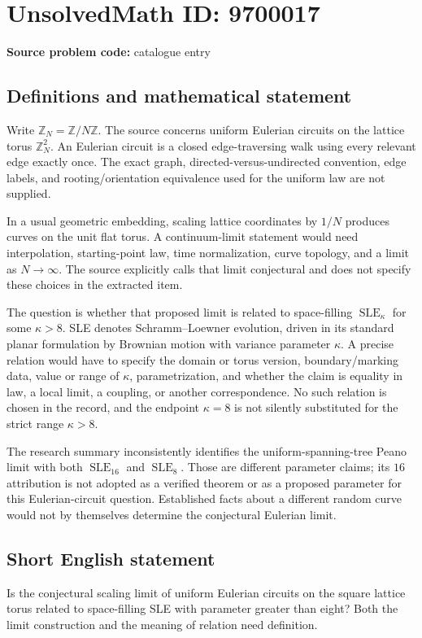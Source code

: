 \documentclass[11pt]{article}
\newcommand{\Z}{\mathbb{Z}}
\begin{document}
\section*{UnsolvedMath ID: 9700017}
\textbf{Source problem code:} catalogue entry
\subsection{Definitions and mathematical statement}
Write $\Z_N=\Z/N\Z$. The source concerns uniform Eulerian circuits on the lattice torus $\Z_N^2$. An Eulerian circuit is a closed edge-traversing walk using every relevant edge exactly once. The exact graph, directed-versus-undirected convention, edge labels, and rooting/orientation equivalence used for the uniform law are not supplied.

In a usual geometric embedding, scaling lattice coordinates by $1/N$ produces curves on the unit flat torus. A continuum-limit statement would need interpolation, starting-point law, time normalization, curve topology, and a limit as $N\to\infty$. The source explicitly calls that limit conjectural and does not specify these choices in the extracted item.

The question is whether that proposed limit is related to space-filling $\operatorname{SLE}_\kappa$ for some $\kappa>8$. SLE denotes Schramm--Loewner evolution, driven in its standard planar formulation by Brownian motion with variance parameter $\kappa$. A precise relation would have to specify the domain or torus version, boundary/marking data, value or range of $\kappa$, parametrization, and whether the claim is equality in law, a local limit, a coupling, or another correspondence. No such relation is chosen in the record, and the endpoint $\kappa=8$ is not silently substituted for the strict range $\kappa>8$.

The research summary inconsistently identifies the uniform-spanning-tree Peano limit with both $\operatorname{SLE}_{16}$ and $\operatorname{SLE}_8$. Those are different parameter claims; its $16$ attribution is not adopted as a verified theorem or as a proposed parameter for this Eulerian-circuit question. Established facts about a different random curve would not by themselves determine the conjectural Eulerian limit.
\subsection{Short English statement}
Is the conjectural scaling limit of uniform Eulerian circuits on the square lattice torus related to space-filling SLE with parameter greater than eight? Both the limit construction and the meaning of relation need definition.
\end{document}

